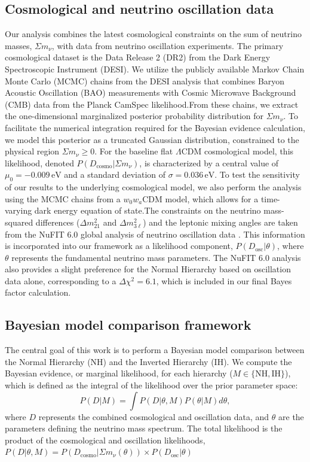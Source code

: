 \documentclass[]{article}
\begin{document}
\subsection{Cosmological and neutrino oscillation data}Our analysis combines the latest cosmological constraints on the sum of neutrino masses, $\Sigma m_\nu$, with data from neutrino oscillation experiments. The primary cosmological dataset is the Data Release 2 (DR2) from the Dark Energy Spectroscopic Instrument (DESI). We utilize the publicly available Markov Chain Monte Carlo (MCMC) chains from the DESI analysis that combines Baryon Acoustic Oscillation (BAO) measurements with Cosmic Microwave Background (CMB) data from the Planck CamSpec likelihood.From these chains, we extract the one-dimensional marginalized posterior probability distribution for $\Sigma m_\nu$. To facilitate the numerical integration required for the Bayesian evidence calculation, we model this posterior as a truncated Gaussian distribution, constrained to the physical region $\Sigma m_\nu \ge 0$. For the baseline flat $\Lambda$CDM cosmological model, this likelihood, denoted $P(D_{\text{cosmo}}|\Sigma m_\nu)$, is characterized by a central value of $\mu_0 = -0.009\,\text{eV}$ and a standard deviation of $\sigma = 0.036\,\text{eV}$. To test the sensitivity of our results to the underlying cosmological model, we also perform the analysis using the MCMC chains from a $w_0w_a$CDM model, which allows for a time-varying dark energy equation of state.The constraints on the neutrino mass-squared differences ($\Delta m^2_{21}$ and $\Delta m^2_{3\ell}$) and the leptonic mixing angles are taken from the NuFIT 6.0 global analysis of neutrino oscillation data \citep{alikhanov2026relationneutrinomasssquareddifferences}. This information is incorporated into our framework as a likelihood component, $P(D_{\text{osc}}|\theta)$, where $\theta$ represents the fundamental neutrino mass parameters. The NuFIT 6.0 analysis also provides a slight preference for the Normal Hierarchy based on oscillation data alone, corresponding to a $\Delta\chi^2 = 6.1$, which is included in our final Bayes factor calculation.\subsection{Bayesian model comparison framework}The central goal of this work is to perform a Bayesian model comparison \citep{thorngren2025bayesianmodelcomparisonsignificance} between the Normal Hierarchy (NH) and the Inverted Hierarchy (IH). We compute the Bayesian evidence, or marginal likelihood, for each hierarchy ($M \in \{\text{NH}, \text{IH}\}$), which is defined as the integral of the likelihood over the prior parameter space:\begin{equation}P(D|M) = \int P(D|\theta, M) P(\theta|M) d\theta,\end{equation}where $D$ represents the combined cosmological and oscillation data, and $\theta$ are the parameters defining the neutrino mass spectrum. The total likelihood is the product of the cosmological and oscillation likelihoods, $P(D|\theta, M) = P(D_{\text{cosmo}}|\Sigma m_\nu(\theta)) \times P(D_{\text{osc}}|\theta)$  
\end{document}
